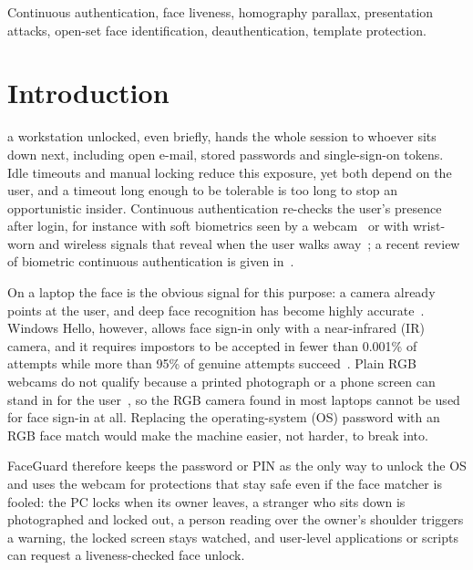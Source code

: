 \documentclass[journal]{IEEEtran}
\newcommand{\sys}{FaceGuard}
\begin{document}
\begin{IEEEkeywords}
Continuous authentication, face liveness, homography parallax, presentation attacks, open-set face identification, deauthentication, template protection.
\end{IEEEkeywords}

\section{Introduction}
 a workstation unlocked, even briefly, hands the whole session to whoever sits down next, including open e-mail, stored passwords and single-sign-on tokens. Idle timeouts and manual locking reduce this exposure, yet both depend on the user, and a timeout long enough to be tolerable is too long to stop an opportunistic insider. Continuous authentication re-checks the user's presence after login, for instance with soft biometrics seen by a webcam~\cite{niinuma2010soft} or with wrist-worn and wireless signals that reveal when the user walks away~\cite{mare2014zebra,conti2017fadewich}; a recent review of biometric continuous authentication is given in~\cite{ayeswarya2024review}.

On a laptop the face is the obvious signal for this purpose: a camera already points at the user, and deep face recognition has become highly accurate~\cite{schroff2015facenet,deng2019arcface}. Windows Hello, however, allows face sign-in only with a near-infrared (IR) camera, and it requires impostors to be accepted in fewer than 0.001\% of attempts while more than 95\% of genuine attempts succeed~\cite{ms2024hello}. Plain RGB webcams do not qualify because a printed photograph or a phone screen can stand in for the user~\cite{zhang2012casiafasd}, so the RGB camera found in most laptops cannot be used for face sign-in at all. Replacing the operating-system (OS) password with an RGB face match would make the machine easier, not harder, to break into.

\sys{} therefore keeps the password or PIN as the only way to unlock the OS and uses the webcam for protections that stay safe even if the face matcher is fooled: the PC locks when its owner leaves, a stranger who sits down is photographed and locked out, a person reading over the owner's shoulder triggers a warning, the locked screen stays watched, and user-level applications or scripts can request a liveness-checked face unlock.
\end{document}
